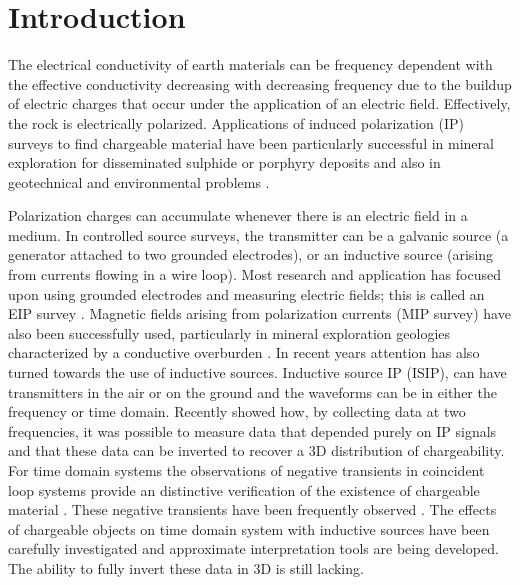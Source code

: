\documentclass[extra,mreferee]{gji}
\begin{document}
\linenumbers
\section{Introduction}
The electrical conductivity of earth materials can be frequency dependent with the effective conductivity decreasing with decreasing frequency due to the buildup of electric charges that occur under the application of an electric field. Effectively, the rock is electrically polarized. 
Applications of induced polarization (IP) surveys to find chargeable material  have been particularly successful in mineral exploration for disseminated sulphide or porphyry deposits \cite[]{Pelton1978, Fink1990} and also in geotechnical and environmental problems \cite[]{Kemna2012}. 


Polarization charges can accumulate whenever there is an electric field in a medium. In controlled source surveys, the transmitter can be a galvanic source (a generator attached to two grounded electrodes), or an inductive source (arising from currents flowing in a wire loop). Most research and application has focused upon using grounded electrodes and measuring electric fields; this is called an EIP survey \cite[]{seigel1959}. Magnetic fields arising from polarization currents (MIP survey) have also been successfully used, particularly in mineral exploration geologies characterized by a conductive overburden \cite[]{seigel1974}. In recent years attention has also turned towards the use of inductive sources. Inductive source IP (ISIP), can have transmitters in the air or on the ground and the waveforms can be in either the frequency or time domain. Recently  \cite[]{Marchant2012b} showed how, by collecting data at two frequencies, it was possible to measure data that depended purely on IP signals and that these data can be inverted to recover a 3D distribution of chargeability. 
For time domain systems the observations of negative transients in coincident loop systems provide an distinctive verification of the existence of chargeable material \cite[]{Weidelt1982}. These negative transients have been frequently observed \cite[]{SmithandKlein,Kang2015a}. The effects of chargeable objects on time domain system with inductive sources have been carefully investigated \cite[]{Smith1988a,Flis1989,ElKaliouby2004, Marchant2014} and approximate interpretation tools \cite[]{Kratzer2012,Hodges2014,Kwan2015} are being developed. The ability to fully invert these data in 3D is still lacking. 
\end{document}
